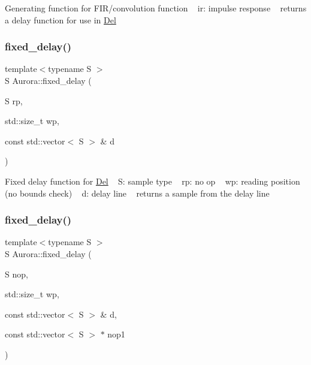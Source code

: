 Generating function for F\+I\+R/convolution function ~\newline
ir\+: impulse response ~\newline
returns a delay function for use in \hyperlink{class_aurora_1_1_del}{Del} \mbox{\label{namespace_aurora_a62442f237e70fdaac1efc22b4e82e875}} 
\subsubsection{\texorpdfstring{fixed\+\_\+delay()}{fixed\_delay()}\hspace{0.1cm}{\footnotesize\ttfamily [1/2]}}
{\footnotesize\ttfamily template$<$typename S $>$ \\
S Aurora\+::fixed\+\_\+delay (\begin{DoxyParamCaption}\item[{S}]{rp,  }\item[{std\+::size\+\_\+t}]{wp,  }\item[{const std\+::vector$<$ S $>$ \&}]{d }\end{DoxyParamCaption})}

Fixed delay function for \hyperlink{class_aurora_1_1_del}{Del} ~\newline
S\+: sample type ~\newline
rp\+: no op ~\newline
wp\+: reading position (no bounds check) ~\newline
d\+: delay line ~\newline
returns a sample from the delay line \mbox{\label{namespace_aurora_ad2d492fbf6dc9b468619e2403ace6e25}} 
\subsubsection{\texorpdfstring{fixed\+\_\+delay()}{fixed\_delay()}\hspace{0.1cm}{\footnotesize\ttfamily [2/2]}}
{\footnotesize\ttfamily template$<$typename S $>$ \\
S Aurora\+::fixed\+\_\+delay (\begin{DoxyParamCaption}\item[{S}]{nop,  }\item[{std\+::size\+\_\+t}]{wp,  }\item[{const std\+::vector$<$ S $>$ \&}]{d,  }\item[{const std\+::vector$<$ S $>$ $\ast$}]{nop1 }\end{DoxyParamCaption})\hspace{0.3cm}{\ttfamily [inline]}}

